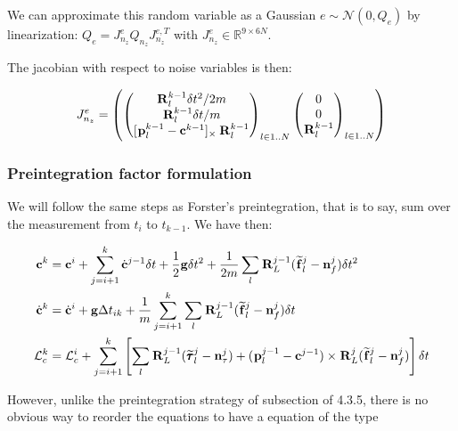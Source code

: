 \documentclass[11pt]{article}
\newcommand{\Rot}[2]{\prescript{#1}{}{\bfR}_{#2}}
\newcommand{\noise}{\bfn}
\newcommand{\posi}[2]{\prescript{#1}{}{\bfp}_{#2}}
\newcommand{\forcem}[2]{\prescript{#1}{}{\widetilde{\bff}}_{#2}}
\newcommand{\torquem}[2]{\prescript{#1}{}{\widetilde{\pmb{\tau}}}_{#2}}
\newcommand{\AM}{\mathcal{L}}
\newcommand{\COM}{\bfc}
\newcommand{\COMd}{\dot{\bfc}}
\newcommand{\Gaussian}[2]{\mathcal{N}({#1},{#2})}
\newcommand{\Reals}{\mathbb{R}}
\begin{document}
We can approximate this random variable as a Gaussian $e \sim \Gaussian{0}{Q_e}$ by linearization: $Q_e = J^e_{n_z} Q_{n_z} J^{e,T}_{n_z}$ with $J^e_{n_z} \in \Reals^{9 \times 6N}$.

The jacobian with respect to noise variables is then:

\begin{equation}
	J^e_{n_z}=
	\left(
	\begin{pmatrix}
	\Rot{}{l}^{k-1} \delta t^2/2m
	\\
	\Rot{}{l}^{k-1} \delta t/m
	\\
	[\posi{}{l}^{k-1} - \COM^{k-1}]_{\times} \Rot{}{l}^{k-1}
	\end{pmatrix}_{l \in 1..N}
	\begin{pmatrix}
	0
	\\
	0
	\\
	\Rot{}{l}^{k-1}
	\end{pmatrix}_{l \in 1..N}
	\right)
\end{equation}


\subsubsection{Preintegration factor formulation}

We will follow the same steps as Forster's preintegration, that is to say, sum over the measurement from $t_i$ to $t_{k-1}$. We have then:





\begin{equation}
\begin{split}
	\COM^{k} &= \COM^{i} + \sum_{j=i+1}^{k}\COMd^{j-1} \delta t 
	+ \frac{1}{2} \bfg \delta t^2 + \frac{1}{2m} \sum_l \Rot{}{L}^{j-1} (\forcem{}{l}^{j} - \noise_f^{j}) \delta t^2
	\\
	\COMd^{k}&= \COMd^{i} + \bfg \Delta t_{ik} + \frac{1}{m}  \sum_{j=i+1}^{k} \sum_l \Rot{}{L}^{j-1} (\forcem{}{l}^{j} - \noise_f^{j}) \delta t 
	\\
	\AM_c^{k} &= \AM_c^{i} +  \sum_{j=i+1}^{k} \left[ 
	\sum_l \Rot{}{L}^{j-1}(\torquem{}{l}^{j} - \noise_{\tau}^{j}) + (\posi{}{l}^{j-1} - \COM^{j-1}) \times \Rot{}{L}^{j}(\forcem{}{l}^{j} - \noise_f^{j}) 
	\right] \delta t
\end{split}
\label{eq:COMDiscreteFeet}
\end{equation}


However, unlike the preintegration strategy of subsection of 4.3.5, there is no obvious way to reorder the equations to have a equation of the type
\end{document}
